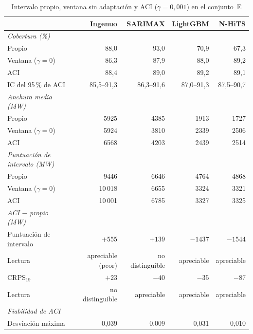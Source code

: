 \begin{table}[H]
	\centering
	\caption{Intervalo propio, ventana sin adaptación y ACI ($\gamma = 0{,}001$) en el conjunto~E}
	\label{tab:cal-aci}
	\small
	\setlength{\tabcolsep}{3.5pt}
	\begin{tabular}{lrrrr}
		\hline
		 & \textbf{Ingenuo} & \textbf{SARIMAX} & \textbf{LightGBM} & \textbf{N-HiTS} \\
		\hline
		\textit{Cobertura (\%)} & & & & \\
		\quad Propio & 88,0 & 93,0 & 70,9 & 67,3 \\
		\quad Ventana ($\gamma = 0$) & 86,3 & 87,9 & 88,0 & 89,2 \\
		\quad ACI & 88,4 & 89,0 & 89,2 & 89,1 \\
		\quad IC del 95\,\% de ACI & 85,5--91,3 & 86,3--91,6 & 87,0--91,3 & 87,5--90,7 \\
		\textit{Anchura media (MW)} & & & & \\
		\quad Propio & 5925 & 4385 & 1913 & 1727 \\
		\quad Ventana ($\gamma = 0$) & 5924 & 3810 & 2339 & 2506 \\
		\quad ACI & 6568 & 4203 & 2439 & 2514 \\
		\textit{Puntuación de intervalo (MW)} & & & & \\
		\quad Propio & 9446 & 6646 & 4764 & 4868 \\
		\quad Ventana ($\gamma = 0$) & 10\,018 & 6655 & 3324 & 3321 \\
		\quad ACI & 10\,001 & 6785 & 3327 & 3325 \\
		\textit{ACI $-$ propio (MW)} & & & & \\
		\quad Puntuación de intervalo & $+555$ & $+139$ & $-1437$ & $-1544$ \\
		\quad Lectura & {\footnotesize apreciable (peor)} & {\footnotesize no distinguible} & apreciable & apreciable \\
		\quad CRPS$_{19}$ & $+23$ & $-40$ & $-35$ & $-87$ \\
		\quad Lectura & {\footnotesize no distinguible} & apreciable & apreciable & apreciable \\
		\textit{Fiabilidad de ACI} & & & & \\
		\quad Desviación máxima & 0,039 & 0,009 & 0,031 & 0,010 \\
		\hline
	\end{tabular}
\end{table}

